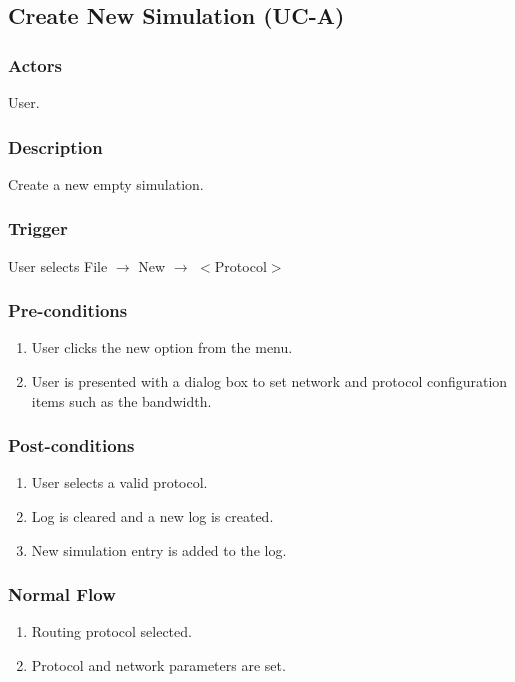 \documentclass[a4paper,11pt,titlepage]{article}
\newcommand{\ra}{
  $\rightarrow$ \xspace
}
\begin{document}
\subsection{Create New Simulation (UC-A)}
\subsubsection{Actors}
User.
\subsubsection{Description}
Create a new empty simulation.
\subsubsection{Trigger}
User selects File\ra New\ra $<$Protocol$>$
\subsubsection{Pre-conditions}

\begin{enumerate}
  \item User clicks the new option from the menu.
  \item User is presented with a dialog box to set network and protocol configuration items such as the bandwidth.
\end{enumerate}

\subsubsection{Post-conditions}

\begin{enumerate}
  \item User selects a valid protocol. 
  \item Log is cleared and a new log is created.
  \item New simulation entry is added to the log. 
\end{enumerate}

\subsubsection{Normal Flow}
\begin{enumerate}
  \item Routing protocol selected.
  \item Protocol and network parameters are set.
\end{enumerate}
\end{document}
